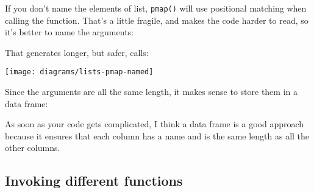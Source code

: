 \documentclass[]{book}
\newenvironment{Shaded}{\begin{snugshade}}{\end{snugshade}}
\newcommand{\KeywordTok}[1]{\textcolor[rgb]{0.13,0.29,0.53}{\textbf{{#1}}}}
\newcommand{\DataTypeTok}[1]{\textcolor[rgb]{0.13,0.29,0.53}{{#1}}}
\newcommand{\DecValTok}[1]{\textcolor[rgb]{0.00,0.00,0.81}{{#1}}}
\newcommand{\StringTok}[1]{\textcolor[rgb]{0.31,0.60,0.02}{{#1}}}
\newcommand{\CommentTok}[1]{\textcolor[rgb]{0.56,0.35,0.01}{\textit{{#1}}}}
\newcommand{\NormalTok}[1]{{#1}}
\begin{document}
If you don't name the elements of list, \texttt{pmap()} will use
positional matching when calling the function. That's a little fragile,
and makes the code harder to read, so it's better to name the arguments:

\begin{Shaded}
\end{Shaded}

That generates longer, but safer, calls:

\begin{center}\texttt{[image: diagrams/lists-pmap-named]} \end{center}

Since the arguments are all the same length, it makes sense to store
them in a data frame:

\begin{Shaded}
\end{Shaded}

As soon as your code gets complicated, I think a data frame is a good
approach because it ensures that each column has a name and is the same
length as all the other columns.

\hypertarget{invoking-different-functions}{\subsection{Invoking
different functions}\label{invoking-different-functions}}
\end{document}
